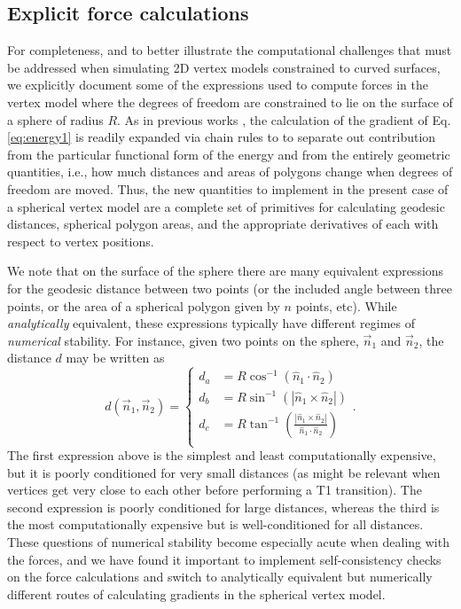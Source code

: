 \documentclass[aps,pre,reprint,superscriptaddress,nofootinbib]{revtex4-2}
\begin{document}
%
%
\subsection{Explicit force calculations}
For completeness, and to better illustrate the computational challenges that must be addressed when simulating 2D vertex models constrained to curved surfaces, we explicitly document some of the expressions used to compute forces in the vertex model where the degrees of freedom are constrained to lie on the surface of a sphere of radius $R$. As in previous works \cite{Bi2015,sussman2017cellGPU,bi2016motility}, the calculation of the gradient of  Eq. \ref{eq:energy1} is readily expanded via chain rules to to separate out contribution from the particular functional form of the energy and from the entirely geometric quantities, i.e., how much distances and areas of polygons change when degrees of freedom are moved. Thus, the new quantities to implement in the present case of a spherical vertex model are a complete set of primitives for calculating geodesic distances, spherical polygon areas, and the appropriate derivatives of each with respect to vertex positions.

We note that on the surface of the sphere there are many equivalent expressions for the geodesic distance between two points (or the included angle between three points, or the area of a spherical polygon given by $n$ points, etc). While \emph{analytically} equivalent, these expressions typically have different regimes of \emph{numerical} stability. For instance, given two points on the sphere, $\vec{n}_1$ and $\vec{n}_2$, the distance $d$ may be written as
\begin{equation}
d(\vec{n}_1,\vec{n}_2) = \left\{
	\begin{aligned}
	d_a&=R \cos^{-1}\left(\hat{n}_1\cdot\hat{n}_2\right)\\
	d_b&=R \sin^{-1}\left(\left|\hat{n}_1\times \hat{n}_2\right|\right)\\
	d_c&=R \tan^{-1}\left(\frac{\left|\hat{n}_1\times \hat{n}_2\right|}{\hat{n}_1\cdot\hat{n}_2}\right)\\
	\end{aligned}
\right. .
\end{equation}
The first expression above is the simplest and least computationally expensive, but it is poorly conditioned for very small distances (as might be relevant when vertices get very close to each other before performing a T1 transition). The second expression is poorly conditioned for large distances, whereas the third is the most computationally expensive but is well-conditioned for all distances. These questions of numerical stability become especially acute when dealing with the forces, and we have found it important to implement self-consistency checks on the force calculations and switch to analytically equivalent but numerically different routes of calculating gradients in the spherical vertex model.
\end{document}
